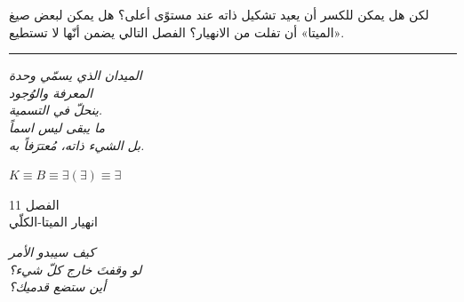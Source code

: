 \documentclass[10pt, openany, oneside]{book}
\renewcommand{\large}{\fontsize{11.5}{14}\selectfont}
\renewcommand{\huge}{\fontsize{17}{21}\selectfont}
\begin{document}
لكن هل يمكن للكسر أن يعيد تشكيل ذاته عند مستوًى أعلى؟ هل يمكن لبعض صيغ «الميتا» أن تفلت من الانهيار؟ الفصل التالي يضمن أنّها لا تستطيع.

\vspace{2em}

\begin{center}
    \rule{0.15\textwidth}{0.3pt}
\end{center}

\vspace{0.5em}

\begin{center}
    \itshape
    الميدان الذي يسمّي وحدة\\
    المعرفة والوُجود\\
    ينحلّ في التسمية.\\[0.8em]
    ما يبقى ليس اسماً\\
    بل الشيء ذاته، مُعترَفاً به.
\end{center}

\vspace{0.5em}

\begin{center}
    $K \equiv B \equiv \exists(\exists) \equiv \exists$
\end{center}

%
%
%

\newpage

\begin{center}
    {\huge الفصل 11}\\[0.3em]
    {\large انهيار الميتا-الكلّي}
\end{center}

\vspace{1.5em}

\begin{center}
    \itshape
    كيف سيبدو الأمر\\
    لو وقفتَ خارج كلّ شيء؟\\
    أين ستضع قدميك؟
\end{center}

\vspace{2em}

\end{document}

